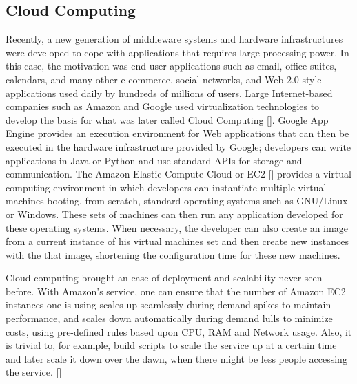 \subsection{Cloud Computing}
Recently, a new generation of middleware systems and hardware infrastructures were developed to cope with applications that requires large processing power. In this case, the motivation was end-user applications such as email, office suites, calendars, and many other e-commerce, social networks, and Web 2.0-style applications used daily by hundreds of millions of users. Large Internet-based companies such as Amazon and Google used virtualization technologies to develop the basis for what was later called Cloud Computing [\citet{ZCB10}]. Google App Engine provides an execution environment for Web applications that can then be executed in the hardware infrastructure provided by Google; developers can write applications in Java or Python and use standard APIs for storage and communication.  The Amazon Elastic Compute Cloud or EC2 [\citet{EC2}] provides a virtual computing environment in which developers can instantiate multiple virtual machines booting, from scratch, standard operating systems such as GNU/Linux or Windows. These sets of machines can then run any application developed for these operating systems. When necessary, the developer can also create an image from a current instance of his virtual machines set and then create new instances with the that image, shortening the configuration time for these new machines.

Cloud computing brought an ease of deployment and scalability never seen before. With Amazon's service, one can ensure that the number of Amazon EC2 instances one is using scales up seamlessly during demand spikes to maintain performance, and scales down automatically during demand lulls to minimize costs, using pre-defined rules based upon CPU, RAM and Network usage. Also, it is trivial to, for example, build scripts to scale the service up at a certain time and later scale it down over the dawn, when there might be less people accessing the service. [\citet{AUTO-SCALE}]

